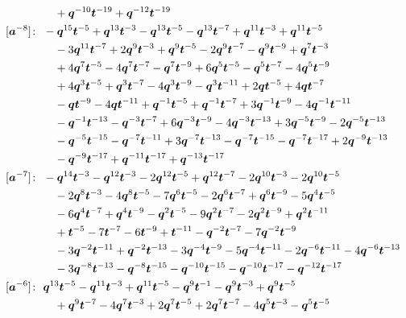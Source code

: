 \begin{align*}
& \quad +\bq^{-10} \bt^{-19} +\bq^{-12} \bt^{-19} \\
[\ba^{-8}]\colon\ & -\bq^{15} \bt^{-5} +\bq^{13} \bt^{-3} -\bq^{13} \bt^{-5} -\bq^{13} \bt^{-7} +\bq^{11} \bt^{-3} +\bq^{11} \bt^{-5} \\
& \quad -3 \bq^{11} \bt^{-7} +2 \bq^{9} \bt^{-3} +\bq^{9} \bt^{-5} -2 \bq^{9} \bt^{-7} -\bq^{9} \bt^{-9} +\bq^{7} \bt^{-3} \\
& \quad +4 \bq^{7} \bt^{-5} -4 \bq^{7} \bt^{-7} -\bq^{7} \bt^{-9} +6 \bq^{5} \bt^{-5} -\bq^{5} \bt^{-7} -4 \bq^{5} \bt^{-9} \\
& \quad +4 \bq^{3} \bt^{-5} +\bq^{3} \bt^{-7} -4 \bq^{3} \bt^{-9} -\bq^{3} \bt^{-11} +2 \bq \bt^{-5} +4 \bq \bt^{-7} \\
& \quad -\bq \bt^{-9} -4 \bq \bt^{-11} +\bq^{-1} \bt^{-5} +\bq^{-1} \bt^{-7} +3 \bq^{-1} \bt^{-9} -4 \bq^{-1} \bt^{-11} \\
& \quad -\bq^{-1} \bt^{-13} -\bq^{-3} \bt^{-7} +6 \bq^{-3} \bt^{-9} -4 \bq^{-3} \bt^{-13} +3 \bq^{-5} \bt^{-9} -2 \bq^{-5} \bt^{-13} \\
& \quad -\bq^{-5} \bt^{-15} -\bq^{-7} \bt^{-11} +3 \bq^{-7} \bt^{-13} -\bq^{-7} \bt^{-15} -\bq^{-7} \bt^{-17} +2 \bq^{-9} \bt^{-13} \\
& \quad -\bq^{-9} \bt^{-17} +\bq^{-11} \bt^{-17} +\bq^{-13} \bt^{-17} \\
[\ba^{-7}]\colon\ & -\bq^{14} \bt^{-3} -\bq^{12} \bt^{-3} -2 \bq^{12} \bt^{-5} +\bq^{12} \bt^{-7} -2 \bq^{10} \bt^{-3} -2 \bq^{10} \bt^{-5} \\
& \quad -2 \bq^{8} \bt^{-3} -4 \bq^{8} \bt^{-5} -7 \bq^{6} \bt^{-5} -2 \bq^{6} \bt^{-7} +\bq^{6} \bt^{-9} -5 \bq^{4} \bt^{-5} \\
& \quad -6 \bq^{4} \bt^{-7} +\bq^{4} \bt^{-9} -\bq^{2} \bt^{-5} -9 \bq^{2} \bt^{-7} -2 \bq^{2} \bt^{-9} +\bq^{2} \bt^{-11} \\
& \quad +\bt^{-5} -7 \bt^{-7} -6 \bt^{-9} +\bt^{-11} -\bq^{-2} \bt^{-7} -7 \bq^{-2} \bt^{-9} \\
& \quad -3 \bq^{-2} \bt^{-11} +\bq^{-2} \bt^{-13} -3 \bq^{-4} \bt^{-9} -5 \bq^{-4} \bt^{-11} -2 \bq^{-6} \bt^{-11} -4 \bq^{-6} \bt^{-13} \\
& \quad -3 \bq^{-8} \bt^{-13} -\bq^{-8} \bt^{-15} -\bq^{-10} \bt^{-15} -\bq^{-10} \bt^{-17} -\bq^{-12} \bt^{-17} \\
[\ba^{-6}]\colon\ & \bq^{13} \bt^{-5} -\bq^{11} \bt^{-3} +\bq^{11} \bt^{-5} -\bq^{9} \bt^{-1} -\bq^{9} \bt^{-3} +\bq^{9} \bt^{-5} \\
& \quad +\bq^{9} \bt^{-7} -4 \bq^{7} \bt^{-3} +2 \bq^{7} \bt^{-5} +2 \bq^{7} \bt^{-7} -4 \bq^{5} \bt^{-3} -\bq^{5} \bt^{-5} \\

\end{align*}
